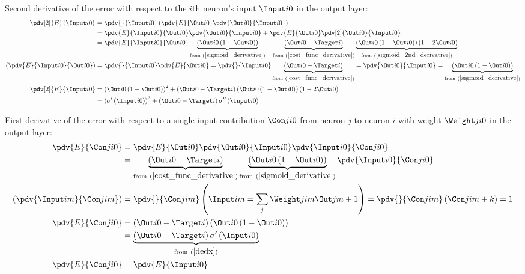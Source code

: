 Second derivative of the error with respect to the $i$th neuron's input $\Input i 0$ in the output layer:
\begin{align}
\pdv[2]{E}{{\Input i 0}} &= \pdv{}{\Input i 0}
\left(\pdv{E}{\Out i 0}\pdv{\Out i 0}{\Input i 0}\right) 
\\
&= \pdv{E}{\Input i 0}{\Out i 0}
\pdv{\Out i 0}{\Input i 0} + \pdv{E}{\Out i 0}\pdv[2]{\Out i 0}{{\Input i 0}}
\\
&= \pdv{E}{\Input i 0}{\Out i 0}
\underbrace{\left(\Out i 0 \left(1 - \Out i 0\right)\right)}_{{\text{from} \ (\ref{sigmoid_derivative})}} + \underbrace{\left(\Out i 0 - \Target i\right)}_{\text{from} \ (\ref{cost_func_derivative})}\underbrace{\left(\Out i 0 \left(1 - \Out i 0\right)\right)\left(1 - 2\Out i 0\right) }_{\text{from}\ (\ref{sigmoid_2nd_derivative})}
\\
\left(\pdv{E}{\Input i 0}{\Out i 0}\right)
&= \pdv{}{\Input i 0}\pdv{E}{\Out i 0} = \pdv{}{\Input i 0}\underbrace{\left(\Out i 0 - \Target i\right)}_{\text{from} \ (\ref{cost_func_derivative})} = \pdv{\Out i 0}{\Input i 0} = \underbrace{\left(\Out i 0 \left(1 - \Out i 0\right)\right)}_{{\text{from} \ (\ref{sigmoid_derivative})}} 
\\
\pdv[2]{E}{{\Input i 0}}&= \left(\Out i 0 \left(1 - \Out i 0\right)\right)^2 + \left(\Out i 0 - \Target i\right)\left(\Out i 0 \left(1 - \Out i 0\right)\right)\left(1 - 2\Out i 0\right) 
\\
&= \left(\sigma^{\prime}\left(\Input i 0\right)\right)^2 + \left(\Out i 0 - \Target i\right)\sigma^{\prime\prime}\left(\Input i 0\right)\label{d2edx2}
\end{align}

First derivative of the error with respect to a single input contribution $\Con j i 0$ from neuron $j$ to neuron $i$ with weight $\Weight j i 0$ in the output layer:
\begin{align}
\pdv{E}{\Con j i 0} &= 
\pdv{E}{\Out i 0}
\pdv{\Out i 0}{\Input i 0}
\pdv{\Input i 0}{\Con j i 0}
\\
&= \underbrace{\left(\Out i 0 - \Target i \right)}_{\text{from} \ (\ref{cost_func_derivative})} \underbrace{\left(\Out i 0 \left(1 - \Out i 0\right) \right)}_{\text{from} \ (\ref{sigmoid_derivative})} \pdv{\Input i 0}{\Con j i 0} 
\\
\left( \pdv{\Input i m}{\Con j i m}\right) &= \pdv{}{\Con j i m}\left(\Input i m = \sum_j\Weight j i m\Out j {m+1} \right) = \pdv{}{\Con j i m} \left(\Con j i m + k \right) = 1\label{dxdc} 
\\
\pdv{E}{\Con j i 0}&= \left(\Out i 0 - \Target i \right) \left(\Out i 0 \left(1 - \Out i 0\right) \right)
\\
&= \underbrace{\left(\Out i 0 - \Target i \right) \sigma^{\prime}\left(\Input i 0\right)\label{dedc}}
_{\text{from} \ (\ref{dedx})} 
\\
\pdv{E}{\Con j i 0} &= \pdv{E}{\Input i 0}
\end{align}

